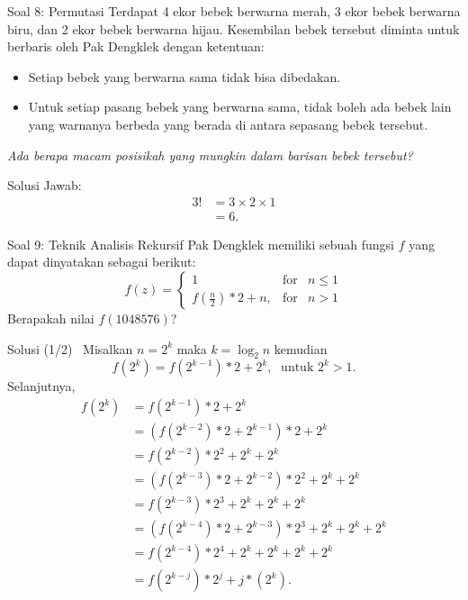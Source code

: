 \documentclass[english,t]{beamer}
\begin{document}
\begin{frame}{Soal 8: Permutasi}
Terdapat 4 ekor bebek berwarna merah, 3 ekor bebek berwarna biru, dan 2 ekor bebek berwarna hijau. Kesembilan bebek tersebut diminta untuk berbaris oleh Pak Dengklek dengan ketentuan:

\begin{itemize}
	\item Setiap bebek yang berwarna sama tidak bisa dibedakan.
	\item Untuk setiap pasang bebek yang berwarna sama, tidak boleh ada bebek lain yang warnanya berbeda yang berada di antara sepasang bebek tersebut.
\end{itemize}

\bigskip
\textit{Ada berapa macam posisikah yang mungkin dalam barisan bebek tersebut?}
\end{frame}

\begin{frame}{Solusi}
Jawab: 
\begin{align*}
	3! &= 3 \times 2 \times 1 \\
	   &= 6.
\end{align*}
\end{frame}

\begin{frame}{Soal 9: Teknik Analisis Rekursif}
Pak Dengklek memiliki sebuah fungsi $f$ yang dapat dinyatakan sebagai berikut:
\begin{equation*}
f(z) =
\left\{ \begin{array}{rcl}
1                       & \mbox{for} & n \leq 1 \\ 
f(\frac{n}{2}) * 2 + n, & \mbox{for} & n > 1
\end{array}\right.
\end{equation*}
Berapakah nilai $f(1048576)$?
\end{frame}

\begin{frame}{Solusi (1/2)~\citep{levitin2012introduction}}
Misalkan $n=2^k$ maka $k = \log_2 n$ kemudian
\begin{equation*}
f(2^k) = f(2^{k-1}) * 2 + 2^k, \; \text{ untuk } 2^k > 1.
\end{equation*}
Selanjutnya,
\begin{align*}
	f(2^k) &= f(2^{k-1}) * 2 + 2^k \\
	       &= (f(2^{k-2}) * 2 + 2^{k-1}) * 2 + 2^k  \\
	       &= f(2^{k-2}) * 2^2 + 2^k + 2^k \\
	       &= (f(2^{k-3}) * 2 + 2^{k-2}) * 2^2 + 2^k + 2^k \\
	       &= f(2^{k-3}) * 2^3 + 2^k + 2^k + 2^k \\
	       &= (f(2^{k-4}) *2 + 2^{k-3}) * 2^3 + 2^k + 2^k + 2^k \\
	       &= f(2^{k-4}) * 2^4 + 2^k + 2^k + 2^k + 2^k \\
	       &= f(2^{k-j}) * 2^j + j * (2^k).
\end{align*}
\end{frame}
\end{document}
